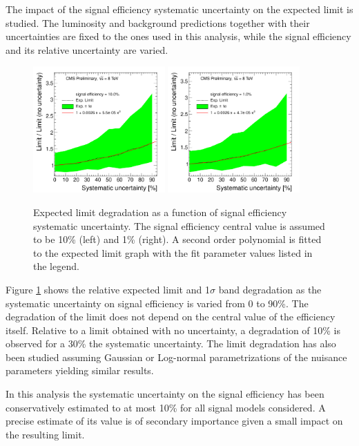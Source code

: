 
The impact of the signal efficiency systematic uncertainty on the expected limit is studied. 
The luminosity and background predictions together with their uncertainties are fixed to the ones used 
in this analysis, while the signal efficiency and its relative uncertainty are varied.


\begin{figure}[htbp]
\centering
\includegraphics[width=0.45\textwidth]{plots/degradation/10percent.pdf}
\includegraphics[width=0.45\textwidth]{plots/degradation/1percent.pdf}
\caption{Expected limit degradation as a function of signal efficiency systematic uncertainty.
The signal efficiency central value is assumed to be 10\% (left) and 1\% (right). A second order polynomial
is fitted to the expected limit graph with the fit parameter values listed in the legend.\label{fig:degradation}}
\end{figure}

Figure \ref{fig:degradation} shows the relative expected limit and 1$\sigma$ band degradation as the 
systematic uncertainty on signal efficiency is varied from 0 to 90\%. The degradation of the limit does not depend
on the central value of the efficiency itself. Relative to a limit obtained with no uncertainty, a 
degradation of 10\% is observed for a 30\% the systematic uncertainty. The limit degradation has also been studied 
assuming Gaussian or Log-normal parametrizations of the nuisance parameters yielding similar results.

In this analysis the systematic uncertainty on the signal efficiency has been conservatively 
estimated to at most 10\% for all signal models considered. A precise estimate of its value is of secondary importance given a small impact on the resulting limit.
      

